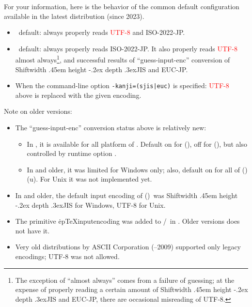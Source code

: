 \documentclass[a4paper,11pt,dvipdfmx]{article}
\def\_{\leavevmode\vrule width .45em height -.2ex depth .3ex\relax}
\begin{document}
\begin{dangerous}
For your information, here is the behavior of the common default
configuration available in the latest \TL distribution (since 2023).
\begin{itemize}
 \def\Opt#1{\textcolor{red}{#1}}
 \item \upTeX\ default: always properly reads \Opt{UTF-8} and ISO-2022-JP.
 \item \pTeX\ default: always properly reads ISO-2022-JP.
   It also properly reads \Opt{UTF-8} almost always\footnote{The
   exception of ``almost always'' comes from a failure of guessing;
   at the expense of properly reading a certain amount of
   Shift\_JIS and EUC-JP, there are occasional misreading of UTF-8.},
   and successful results of ``guess-input-enc'' conversion of
   Shift\_JIS and EUC-JP.
 \item When the command-line option \verb+-kanji=(sjis|euc)+ is
   specified: \Opt{UTF-8} above is replaced with the given encoding.
\end{itemize}
\end{dangerous}

\begin{dangerous}
Note on older versions:
\begin{itemize}
 \item The ``guess-input-enc'' conversion status above is relatively new:
  \begin{itemize}
   \item In , it is available for all platform of \TL.
     Default on for (\eTeXpre)\pTeX, off for (\eTeXpre)\upTeX,
     but also controlled by runtime option .
   \item In  and older, it was limited for Windows only;
     also, default on for all of (\eTeXpre)(u)\pTeX.
     For Unix it was not implemented yet.
  \end{itemize}
 \item In  and older,
   the default input encoding of (\eTeXpre)\pTeX\ was
   Shift\_JIS for Windows, UTF-8 for Unix.
 \item The primitive \.{epTeXinputencoding} was added to
   \epTeX/\eupTeX\ in . Older versions does not have it.
 \item Very old distributions by ASCII Corporation (--2009)
   supported only legacy encodings; UTF-8 was not allowed.
\end{itemize}
\end{dangerous}
\end{document}
